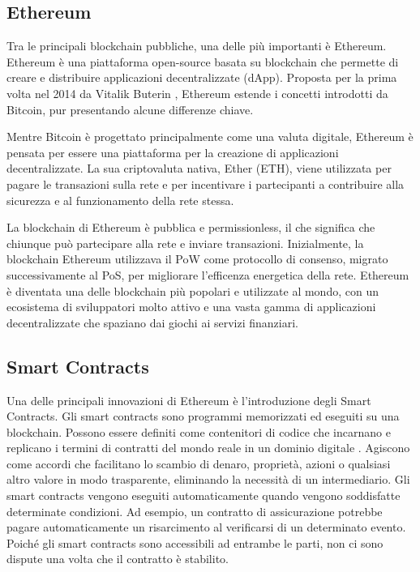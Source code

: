 \documentclass[../../Thesis.tex]{subfiles}
\begin{document}
\subsection{Ethereum}


Tra le principali blockchain pubbliche, una delle più importanti è Ethereum. Ethereum è una piattaforma open-source basata su blockchain che permette di creare e distribuire applicazioni decentralizzate (dApp). Proposta per la prima volta nel 2014 da Vitalik Buterin  \cite{Ethereum}, Ethereum estende i concetti introdotti da Bitcoin, pur presentando alcune differenze chiave.

Mentre Bitcoin è progettato principalmente come una valuta digitale, Ethereum è pensata per essere una piattaforma per la creazione di applicazioni decentralizzate. La sua criptovaluta nativa, Ether (ETH), viene utilizzata per pagare le transazioni sulla rete e per incentivare i partecipanti a contribuire alla sicurezza e al funzionamento della rete stessa.

La blockchain di Ethereum è pubblica e permissionless, il che significa che chiunque può partecipare alla rete e inviare transazioni. Inizialmente, la blockchain Ethereum utilizzava il PoW come protocollo di consenso, migrato successivamente al PoS, per migliorare l'efficenza energetica della rete. Ethereum è diventata una delle blockchain più popolari e utilizzate al mondo, con un ecosistema di sviluppatori molto attivo e una vasta gamma di applicazioni decentralizzate che spaziano dai giochi ai servizi finanziari.

\subsection{Smart Contracts}


Una delle principali innovazioni di Ethereum è l'introduzione degli Smart Contracts. Gli smart contracts sono programmi memorizzati ed eseguiti su una blockchain. Possono essere definiti come contenitori di codice che incarnano e replicano i termini di contratti del mondo reale in un dominio digitale \cite{SCReview}. Agiscono come accordi che facilitano lo scambio di denaro, proprietà, azioni o qualsiasi altro valore in modo trasparente, eliminando la necessità di un intermediario. Gli smart contracts vengono eseguiti automaticamente quando vengono soddisfatte determinate condizioni. Ad esempio, un contratto di assicurazione potrebbe pagare automaticamente un risarcimento al verificarsi di un determinato evento. Poiché gli smart contracts sono accessibili ad entrambe le parti, non ci sono dispute una volta che il contratto è stabilito. 
\end{document}
